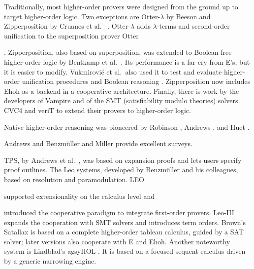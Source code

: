   \begin{sloppypar}
  Traditionally, most higher-order provers were designed from the ground up
  to target higher-order logic. Two
  exceptions are Otter-$\lambda$ by Beeson \cite{mb-04-lam-logic} and
  Zipperposition by Cruanes et al.\ %
  \cite{sc-15-simon-phd,bbtvw-21-sup-lam}. \hbox{Otter-$\lambda$}
  adds $\lambda$-terms and second-order unification to
  the superposition prover Otter\begin{rep} \cite{mcc-03-otter}\end{rep}.
  Zipperposition, also based on superposition, was extended
  to Bool\-e\-an-free higher-order logic by Bentkamp et al.\
  \cite{bbtvw-21-sup-lam}. Its performance is a far cry from E's, but
  it is easier to modify.
  Vukmirovi\'c et al.\ also used it to test and evaluate higher-order unification
  procedures \cite{vbn-21-unif} and Boolean reasoning
  \cite{vn-20-bools}.
  Zipperposition now includes Ehoh as a backend in a cooperative
  architecture.
  Finally, there is work by the developers of Vampire
  \cite{br-19-restricted-unif} and of the SMT
  (satisfiability modulo theories) solvers CVC4 and veriT
  \cite{brotb-19-ho-smt} to extend their provers to higher-order logic.
  \end{sloppypar}
  
  Native higher-order reasoning was pioneered by Rob\-in\-son
  \cite{ar-69-hol}, Andrews \cite{pa-71-type-theory}, and Huet
  \cite{gh-73-hol}.\begin{rep} Andrews \cite{pa-01-classical-ty-thy} and Benz\-m\"uller and Miller
  \cite{bm-14-automation-ho} provide excellent surveys.\end{rep}
  TPS, by Andrews et al.~\cite{abinpx-96-tps}, was
  based on expansion proofs and lets users specify proof outlines.
  The Leo \confrep{}{family of }systems, developed by Benzm\"uller and his colleagues,
  \confrep{are}{is} based on resolution and paramodulation.
  LEO~\cite{cbmk-98-leo} \begin{rep}supported extensionality
  on the calculus level and \end{rep}introduced the cooperative paradigm to
  integrate first-order provers.
  Leo-III \cite{sb-21-leo3} expands the cooperation with
  SMT solvers
  and introduces term orders.
  Brown's Sat\-al\-lax \cite{cb-12-satallax} is based on a
  complete higher-order tableau calculus,
  guided by a SAT solver; later versions also cooperate with E and Ehoh.
  Another noteworthy sys\-tem is Lindblad's agsy\-HOL \cite{fl-14-agsyhol}.
  It is based on a focused sequent calculus driven by a generic narrowing engine.
  
